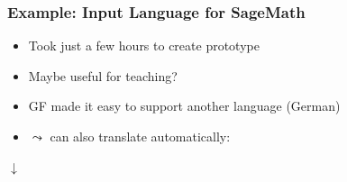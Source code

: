 \begin{frame}[fragile]
    \frametitle{Example: Input Language for SageMath}
    \begin{itemize}
        \item Took just a few hours to create prototype
        \item Maybe useful for teaching?
        \item GF made it easy to support another language (German)
        \item $\leadsto$ can also translate automatically:
    \end{itemize}

    \centering
    \vspace{1.5em}
    \par
    $\downarrow$\par
    \par
\end{frame}


